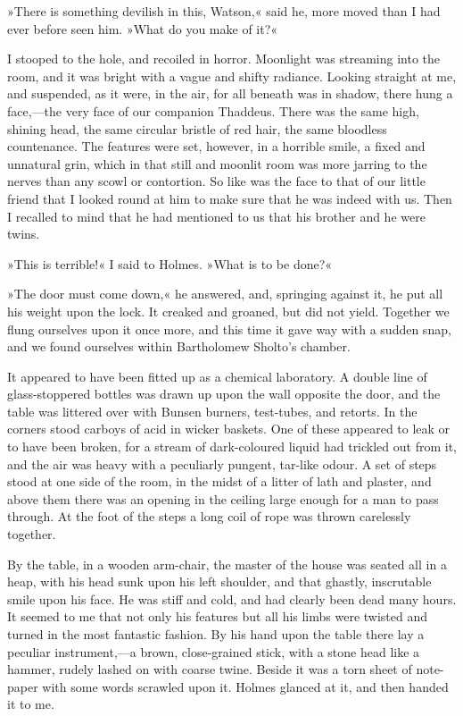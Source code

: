 »There is something devilish in this, Watson,« said he, more moved than I had ever before seen him. »What do you make of it?«

I stooped to the hole, and recoiled in horror. Moonlight was streaming into the room, and it was bright with a vague and shifty radiance. Looking straight at me, and suspended, as it were, in the air, for all beneath was in shadow, there hung a face,—the very face of our companion Thaddeus. There was the same high, shining head, the same circular bristle of red hair, the same bloodless countenance. The features were set, however, in a horrible smile, a fixed and unnatural grin, which in that still and moonlit room was more jarring to the nerves than any scowl or contortion. So like was the face to that of our little friend that I looked round at him to make sure that he was indeed with us. Then I recalled to mind that he had mentioned to us that his brother and he were twins.

»This is terrible!« I said to Holmes. »What is to be done?«

»The door must come down,« he answered, and, springing against it, he put all his weight upon the lock. It creaked and groaned, but did not yield. Together we flung ourselves upon it once more, and this time it gave way with a sudden snap, and we found ourselves within Bartholomew Sholto's chamber.

It appeared to have been fitted up as a chemical laboratory. A double line of glass-stoppered bottles was drawn up upon the wall opposite the door, and the table was littered over with Bunsen burners, test-tubes, and retorts. In the corners stood carboys of acid in wicker baskets. One of these appeared to leak or to have been broken, for a stream of dark-coloured liquid had trickled out from it, and the air was heavy with a peculiarly pungent, tar-like odour. A set of steps stood at one side of the room, in the midst of a litter of lath and plaster, and above them there was an opening in the ceiling large enough for a man to pass through. At the foot of the steps a long coil of rope was thrown carelessly together.

By the table, in a wooden arm-chair, the master of the house was seated all in a heap, with his head sunk upon his left shoulder, and that ghastly, inscrutable smile upon his face. He was stiff and cold, and had clearly been dead many hours. It seemed to me that not only his features but all his limbs were twisted and turned in the most fantastic fashion. By his hand upon the table there lay a peculiar instrument,—a brown, close-grained stick, with a stone head like a hammer, rudely lashed on with coarse twine. Beside it was a torn sheet of note-paper with some words scrawled upon it. Holmes glanced at it, and then handed it to me.

